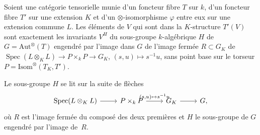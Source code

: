 \begin{encadre}
\begin{theoreme*}\nonverifie
Soient une catégorie tensorielle munie d'un foncteur fibre $T$ sur $k$, d'un foncteur fibre $T'$ sur une extension $K$ et d'un $\otimes$-isomorphisme $\varphi$ entre eux sur une extension commune $L$. Les éléments de $V$ qui sont dans la $K$-structure $T'(V)$ sont exactement les invariants $V^H$ du sous-groupe $k$-algébrique $H$ de $G = \mathrm{Aut}^\otimes(T)$ engendré par l'image dans $G$ de l'image fermée $R \subset G_K$ de $\operatorname{Spec}(L \otimes_K L) \to P \times_k P \to G_K$, $(s, u) \mapsto s^{-1}u$, sans point base sur le torseur $P = \mathrm{Isom}^\otimes(T_K, T')$.
\end{theoreme*}
\end{encadre}
Le sous-groupe $H$ se lit sur la suite de flèches
\[
\begin{tikzcd}
\operatorname{Spec}(L \otimes_K L) \arrow[r] & P \times_k P \arrow[r, "{(s, u) \mapsto s^{-1}u}"] & G_K \arrow[r] & G ,
\end{tikzcd}
\]
où $R$ est l'image fermée du composé des deux premières et $H$ le sous-groupe de $G$ engendré par l'image de~$R$.

